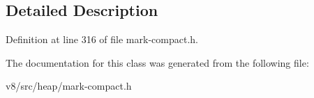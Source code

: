 \subsection{Detailed Description}


Definition at line 316 of file mark-\/compact.\+h.



The documentation for this class was generated from the following file\+:\begin{DoxyCompactItemize}
\item 
v8/src/heap/mark-\/compact.\+h\end{DoxyCompactItemize}
